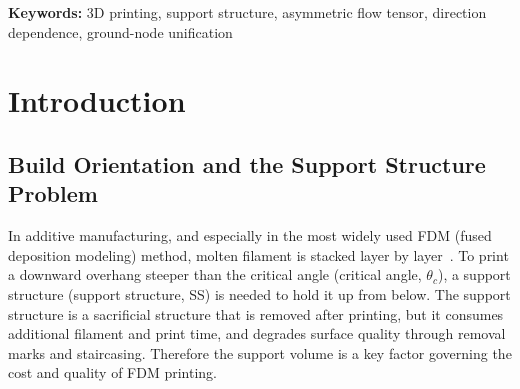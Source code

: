 \documentclass[11pt,a4paper]{article}
\begin{document}
\begin{abstract}
In correlation analysis, ablation, and Leave-One-Mesh-Out cross-validation on a stored TOMO\_INT3 grid,
the proposed method was consistently superior to directions based on PCA and Support Tensor eigenvectors.
In addition, on a difficulty-controlled five-group shape set (from basic shapes up to large meshes with $\sim$$10^6$ faces, based on a $3^\circ$ exhaustive sweep),
Python SFTF showed a computation-time reduction of $1.4$--$34\times$ relative to TOMO\_INT3,
and C++ SFTF of $10$--$5{,}160\times$.
We also confirmed that, although TOMO\_CUDA is faster than INT3 on simple shapes, it is not always superior on real parts and large meshes,
showing that the core gain lies in reducing the number of candidates rather than in changing the exhaustive-sweep backend.
Furthermore, by measuring the change in TOMO optimal orientation and support volume across critical angles $\theta_c\in\{0,30,45,60,90\}^\circ$,
we confirmed that the support volume decreases monotonically as $\theta_c$ increases, while the global optimal orientation shifts.
Finally, after coarse spherical sampling we resample at small angles around good candidates,
and present not a single optimum but several mutually separated near-optimal orientation groups (basins) together.
\end{abstract}

\noindent\textbf{Keywords:} 3D printing, support structure, asymmetric flow tensor, direction dependence, ground-node unification

\section{Introduction}

\subsection{Build Orientation and the Support Structure Problem}

In additive manufacturing, and especially in the most widely used FDM (fused deposition modeling) method,
molten filament is stacked layer by layer~\cite{gibson}.
To print a downward overhang steeper than the critical angle (critical angle, $\theta_c$),
a support structure (support structure, SS) is needed to hold it up from below.
The support structure is a sacrificial structure that is removed after printing, but it consumes additional filament and print time,
and degrades surface quality through removal marks and staircasing.
Therefore the support volume is a key factor governing the cost and quality of FDM printing.
\end{document}
